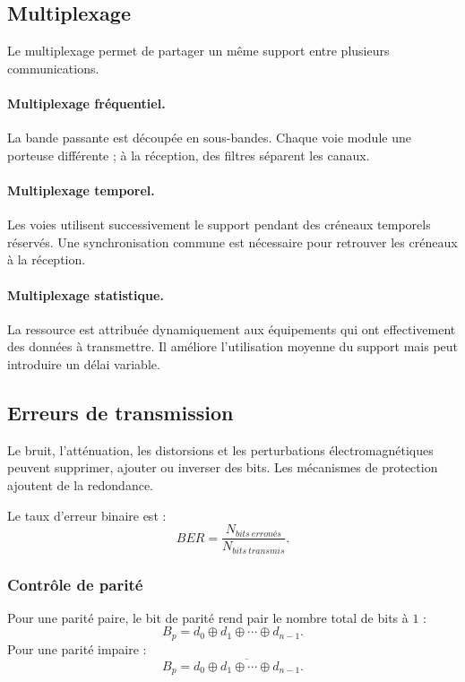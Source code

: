 \subsection{Multiplexage}

Le multiplexage permet de partager un même support entre plusieurs communications.

\paragraph{Multiplexage fréquentiel.}
La bande passante est découpée en sous-bandes. Chaque voie module une porteuse différente ; à la réception, des filtres séparent les canaux.


\paragraph{Multiplexage temporel.}
Les voies utilisent successivement le support pendant des créneaux temporels réservés. Une synchronisation commune est nécessaire pour retrouver les créneaux à la réception.

\paragraph{Multiplexage statistique.}
La ressource est attribuée dynamiquement aux équipements qui ont effectivement des données à transmettre. Il améliore l'utilisation moyenne du support mais peut introduire un délai variable.

\subsection{Erreurs de transmission}

Le bruit, l'atténuation, les distorsions et les perturbations électromagnétiques peuvent supprimer, ajouter ou inverser des bits. Les mécanismes de protection ajoutent de la redondance.

Le taux d'erreur binaire est :
\[
\boxed{BER=\frac{N_{bits\ erronés}}{N_{bits\ transmis}}.}
\]

\subsubsection{Contrôle de parité}

Pour une parité paire, le bit de parité rend pair le nombre total de bits à $1$ :
\[
\boxed{B_p=d_0\oplus d_1\oplus\cdots\oplus d_{n-1}.}
\]
Pour une parité impaire :
\[
\boxed{B_p=\overline{d_0\oplus d_1\oplus\cdots\oplus d_{n-1}}.}
\]

